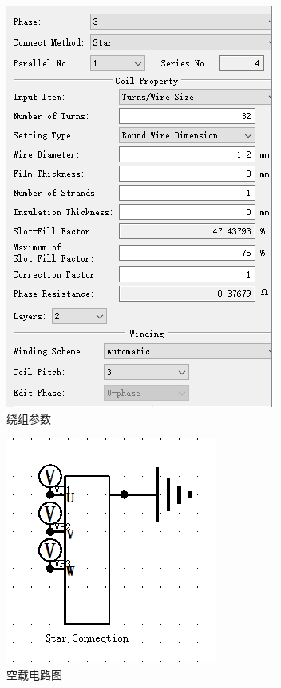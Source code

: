 \documentclass{thuemp}
\begin{document}
\begin{figure}[H]
  \centering
  \includegraphics[width=0.8\linewidth]{./img/task1/model1-config-winding.png}
  \caption{绕组参数}
\end{figure}
\begin{figure}[H]
  \centering
  \includegraphics[width=0.8\linewidth]{./img/task1/noload.png}
  \caption{空载电路图}
\end{figure}
\end{document}
